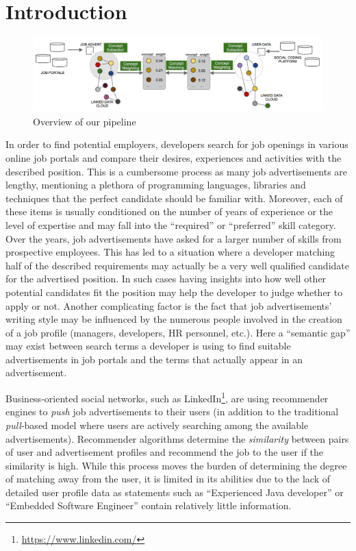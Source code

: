 \documentclass[conference]{IEEEtran}
\begin{document}
\section{Introduction}

\begin{figure}[!htb]
\centering
\includegraphics[scale=0.35]{../figs/pipeline.png}
\caption{Overview of our pipeline}
\label{fig:pipeline}
\end{figure}

In order to find potential employers,
developers search for job openings in various online job portals and compare
their desires, experiences and activities with the described position. This is a
cumbersome process as many job advertisements are lengthy, mentioning a plethora
of programming languages, libraries and techniques that the perfect candidate
should be familiar with. Moreover, each of these items is usually conditioned
on the number of years of experience or the level of expertise and may fall into
the ``required'' or ``preferred'' skill category. Over the years, job
advertisements have asked for a larger number of skills from prospective
employees. This has led to a situation where a developer matching half of the
described requirements may actually be a very well qualified candidate for the
advertised position. In such cases having insights into how well other potential
candidates fit the position may help the developer to judge whether to apply or
not. Another complicating factor is the fact that job advertisements' writing
style may be influenced by the numerous people involved in the creation of a job
profile (managers, developers, HR personnel, etc.). Here a ``semantic gap'' may
exist between search terms a developer is using to find suitable advertisements
in job portals and the terms that actually appear in an advertisement.

Business-oriented social networks, such as
LinkedIn\footnote{\url{https://www.linkedin.com/}}, are using recommender engines
to \emph{push} job advertisements to their users (in addition to the traditional
\emph{pull}-based model where users are actively searching among the available
advertisements). Recommender algorithms determine the \emph{similarity} between
pairs of user and advertisement profiles and recommend the job to the user if
the similarity is high. While this process moves the burden of determining the
degree of matching away from the user, it is limited in its abilities due to the
lack of detailed user profile data as statements such as ``Experienced Java
developer'' or ``Embedded Software Engineer'' contain relatively little
information.
\end{document}
